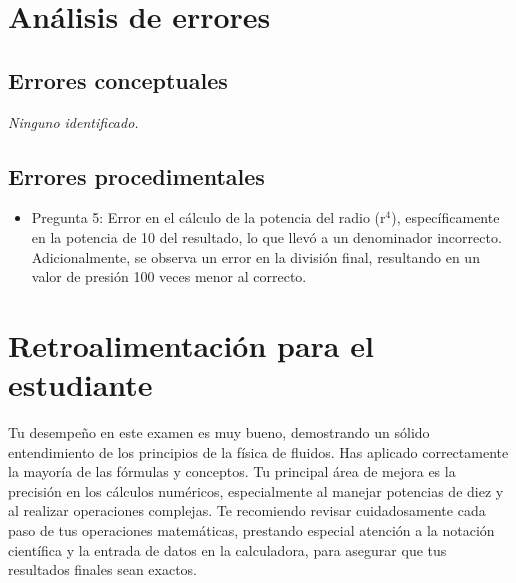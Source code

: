 \documentclass[11pt,a4paper]{article}
\begin{document}
\section*{Análisis de errores}

\subsection*{Errores conceptuales}
\textit{Ninguno identificado.}

\subsection*{Errores procedimentales}
\begin{itemize}[leftmargin=1.5em, itemsep=2pt]
  \item Pregunta 5: Error en el cálculo de la potencia del radio (r$^{4}$), específicamente en la potencia de 10 del resultado, lo que llevó a un denominador incorrecto. Adicionalmente, se observa un error en la división final, resultando en un valor de presión 100 veces menor al correcto.
\end{itemize}

\section*{Retroalimentación para el estudiante}
\begin{tcolorbox}[cajaRecomendacion, title={Dirigido a: estefani santoya 31686375}]
Tu desempeño en este examen es muy bueno, demostrando un sólido entendimiento de los principios de la física de fluidos. Has aplicado correctamente la mayoría de las fórmulas y conceptos. Tu principal área de mejora es la precisión en los cálculos numéricos, especialmente al manejar potencias de diez y al realizar operaciones complejas. Te recomiendo revisar cuidadosamente cada paso de tus operaciones matemáticas, prestando especial atención a la notación científica y la entrada de datos en la calculadora, para asegurar que tus resultados finales sean exactos.
\end{tcolorbox}

\end{document}
